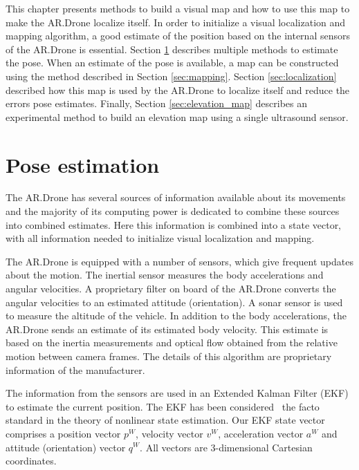 This chapter presents methods to build a visual map and how to use this map to make the AR.Drone localize itself.
In order to initialize a visual localization and mapping algorithm, a good estimate of the position based on the internal sensors of the AR.Drone is essential.
Section \ref{sec:pose_estimation} describes multiple methods to estimate the pose.
When an estimate of the pose is available, a map can be constructed using the method described in Section \ref{sec:mapping}.
Section \ref{sec:localization} described how this map is used by the AR.Drone to localize itself and reduce the errors pose estimates.
Finally, Section \ref{sec:elevation_map} describes an experimental method to build an elevation map using a single ultrasound sensor.

	\section{Pose estimation}
	\label{sec:pose_estimation}
The AR.Drone has several sources of information available about its movements and the majority of its computing power is dedicated to combine these sources into combined estimates. Here this information is combined into a state vector, with all information needed to initialize visual localization and mapping.

The AR.Drone is equipped with a number of sensors, which give frequent updates about the motion. 
The inertial sensor measures the body accelerations and angular velocities.
A proprietary filter on board of the AR.Drone converts the angular velocities to an estimated attitude (orientation).
A sonar sensor is used to measure the altitude of the vehicle.
In addition to the body accelerations, the AR.Drone sends an estimate of its estimated body velocity.
This estimate is based on the inertia measurements and optical flow obtained from the relative motion between camera frames.
The details of this algorithm are proprietary information of the manufacturer. 

The information from the sensors are used in an Extended Kalman Filter (EKF) to estimate the current position.
The EKF has been considered~\cite{julier2004unscented} the facto standard in the theory of nonlinear state estimation.
Our EKF state vector comprises a position vector $p^{W}$, velocity vector $v^{W}$, acceleration vector $a^{W}$ and attitude (orientation) vector $q^{W}$.
All vectors are 3-dimensional Cartesian coordinates.

